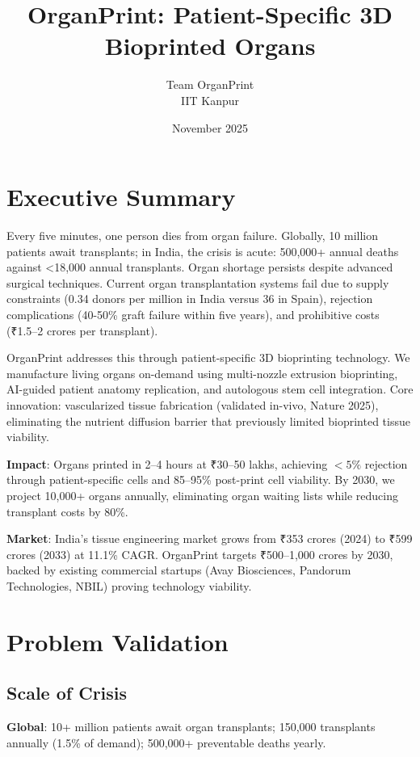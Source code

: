 \documentclass[11pt,a4paper]{article}
\title{\textbf{OrganPrint: Patient-Specific 3D Bioprinted Organs}}
\author{Team OrganPrint \\ IIT Kanpur}
\date{November 2025}
\begin{document}
\maketitle

\section*{Executive Summary}

Every five minutes, one person dies from organ failure. Globally, 10 million patients await transplants; in India, the crisis is acute: 500,000+ annual deaths against <18,000 annual transplants. Organ shortage persists despite advanced surgical techniques. Current organ transplantation systems fail due to supply constraints (0.34 donors per million in India versus 36 in Spain), rejection complications (40-50\% graft failure within five years), and prohibitive costs (₹1.5--2 crores per transplant).

OrganPrint addresses this through patient-specific 3D bioprinting technology. We manufacture living organs on-demand using multi-nozzle extrusion bioprinting, AI-guided patient anatomy replication, and autologous stem cell integration. Core innovation: vascularized tissue fabrication (validated in-vivo, Nature 2025), eliminating the nutrient diffusion barrier that previously limited bioprinted tissue viability.

\textbf{Impact}: Organs printed in 2--4 hours at ₹30--50 lakhs, achieving $<5\%$ rejection through patient-specific cells and 85--95\% post-print cell viability. By 2030, we project 10,000+ organs annually, eliminating organ waiting lists while reducing transplant costs by 80\%.

\textbf{Market}: India's tissue engineering market grows from ₹353 crores (2024) to ₹599 crores (2033) at 11.1\% CAGR. OrganPrint targets ₹500--1,000 crores by 2030, backed by existing commercial startups (Avay Biosciences, Pandorum Technologies, NBIL) proving technology viability.

\section{Problem Validation}

\subsection{Scale of Crisis}

\textbf{Global}: 10+ million patients await organ transplants; 150,000 transplants annually (1.5\% of demand); 500,000+ preventable deaths yearly.
\end{document}
